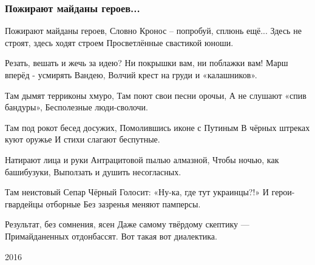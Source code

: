  
 
 

\subsubsection{Пожирают майданы героев...}

Пожирают майданы героев,
Словно Кронос – попробуй, сплюнь ещё...
Здесь не строят, здесь ходят строем
Просветлённые свастикой юноши.

Резать, вешать и жечь за идею?
Ни покрышки вам, ни поблажки вам!
Марш вперёд - усмирять Вандею,
Волчий крест на груди и «калашников».

Там дымят терриконы хмуро,
Там поют свои песни орочьи,
А не слушают «спив бандуры»,
Бесполезные люди-сволочи.

Там под рокот бесед досужих,
Помолившись иконе с Путиным
В чёрных штреках куют оружье
И стихи слагают беспутные.

Натирают лица и руки
Антрацитовой пылью алмазной,
Чтобы ночью, как башибузуки,
Выползать и душить несогласных.

Там неистовый Сепар Чёрный
Голосит: «Ну-ка, где тут украинцы?!»
И герои-гвардейцы отборные
Без зазренья меняют памперсы.

Результат, без сомнения, ясен
Даже самому твёрдому скептику —
Примайданенных отдонбассят.
Вот такая вот диалектика.

2016 
